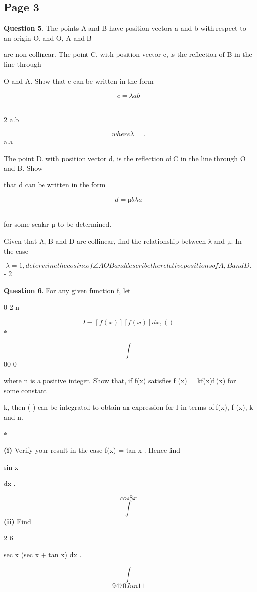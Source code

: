 \documentclass[12pt]{article}
\begin{document}
\subsection*{Page 3}
\begin{flushleft}
\bigskip\textbf{Question 5.} The points A and B have position vectors a and b with respect to an origin O, and O, A and B\par
are non-collinear. The point C, with position vector c, is the reflection of B in the line through\par
O and A. Show that c can be written in the form\par
\[c = λa b\]
-\par
2 a.b\par
\[where λ = .\]
a.a\par
The point D, with position vector d, is the reflection of C in the line through O and B. Show\par
that d can be written in the form\par
\[d = µb λa\]
-\par
for some scalar µ to be determined.\par
Given that A, B and D are collinear, find the relationship between λ and µ. In the case\par
\[λ = 1 , determine the cosine of ∠AOB and describe the relative positions of A, B and D.\]
- 2\par
\bigskip\textbf{Question 6.} For any given function f, let\par
0 2 n\par
\[I = [f (x)] [f(x)] dx , ( )\]
∗\par
\[\int\]
00 0\par
where n is a positive integer. Show that, if f(x) satisfies f (x) = kf(x)f (x) for some constant\par
k, then ( ) can be integrated to obtain an expression for I in terms of f(x), f (x), k and n.\par
∗\par
\textbf{(i)} Verify your result in the case f(x) = tan x . Hence find\par
sin x\par
dx .\par
\[cos8 x\]
\[\int\]
\textbf{(ii)} Find\par
2 6\par
sec x (sec x + tan x) dx .\par
\[\int\]
\[9470 Jun11\]
\end{flushleft}
\end{document}
